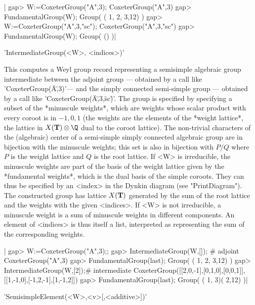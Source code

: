 |    gap> W:=CoxeterGroup("A",3);
    CoxeterGroup("A",3)
    gap> FundamentalGroup(W);
    Group( ( 1, 2, 3,12) )
    gap> W:=CoxeterGroup("A",3,"sc");
    CoxeterGroup("A",3,"sc")
    gap> FundamentalGroup(W);
    Group( () )|


'IntermediateGroup(<W>, <indices>)'

This computes a Weyl group record representing a semisimple algebraic group
intermediate  between  the  adjoint  group  ---  obtained  by  a  call like
'CoxeterGroup(\"A\",3)'---  and the simply  connected semi-simple group ---
obtained  by  a  call  like  'CoxeterGroup(\"A\",3,\"sc\")'.  The  group is
specified  by specifying  a subset  of the  *minuscule weights*,  which are
weights  whose scalar product with every coroot is in $-1,0,1$ (the weights
are  the elements of the *weight lattice*, the lattice in $X(\bT)\otimes\Q$
dual  to the coroot lattice). The non-trivial characters of the (algebraic)
center  of a semi-simple simply connected  algebraic group are in bijection
with  the minuscule weights; this set is also in bijection with $P/Q$ where
$P$  is  the  weight  lattice  and  $Q$  is  the  root  lattice.  If <W> is
irreducible,  the minuscule  weights are  part of  the basis  of the weight
lattice  given by the *fundamental weights*, which is the dual basis of the
simple  coroots. They  can thus  be specified  by an  <index> in the Dynkin
diagram  (see "PrintDiagram").  The constructed  group has lattice $X({\mathbf T})$
generated  by the sum  of the root  lattice and the  weights with the given
<indices>.  If  <W>  is  not  irreducible,  a  minuscule weight is a sum of
minuscule  weights in different components. An element of <indices> is thus
itself  a list,  interpreted as  representing the  sum of the corresponding
weights.

|    gap> W:=CoxeterGroup("A",3);;
    gap> IntermediateGroup(W,[]); # adjoint
    CoxeterGroup("A",3)
    gap> FundamentalGroup(last);
    Group( ( 1, 2, 3,12) )
    gap> IntermediateGroup(W,[2]);# intermediate
    CoxeterGroup([[2,0,-1],[0,1,0],[0,0,1]],[[1,-1,0],[-1,2,-1],[1,-1,2]])
    gap> FundamentalGroup(last);
    Group( ( 1, 3)( 2,12) )|


'SemisimpleElement(<W>,<v>[,<additive>])'

